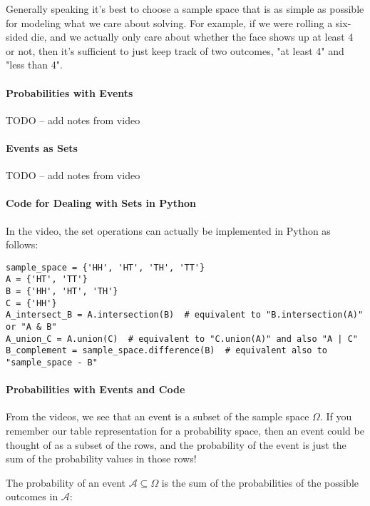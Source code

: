 \documentclass[6008notes.tex]{subfiles}
\begin{document}
Generally speaking it's best to choose a sample space that is as simple as possible for modeling what we care about solving. For example, if we were rolling a six-sided die, and we actually only care about whether the face shows up at least 4 or not, then it's sufficient to just keep track of two outcomes, "at least 4" and "less than 4".

\paragraph{Probabilities with Events}

TODO -- add notes from video

\paragraph{Events as Sets}

TODO -- add notes from video

\paragraph{Code for Dealing with Sets in Python}

In the video, the set operations can actually be implemented in Python as follows:

\begin{lstlisting}
sample_space = {'HH', 'HT', 'TH', 'TT'}
A = {'HT', 'TT'}
B = {'HH', 'HT', 'TH'}
C = {'HH'}
A_intersect_B = A.intersection(B)  # equivalent to "B.intersection(A)" or "A & B"
A_union_C = A.union(C)  # equivalent to "C.union(A)" and also "A | C"
B_complement = sample_space.difference(B)  # equivalent also to "sample_space - B"
\end{lstlisting}

\paragraph{Probabilities with Events and Code}

From the videos, we see that an event is a subset of the sample space $\Omega$. If you remember our table representation for a probability space, then an event could be thought of as a subset of the rows, and the probability of the event is just the sum of the probability values in those rows!

The probability of an event $\mathcal{A}\subseteq \Omega$ is the sum of the probabilities of the possible outcomes in $\mathcal{A}$:
\end{document}
